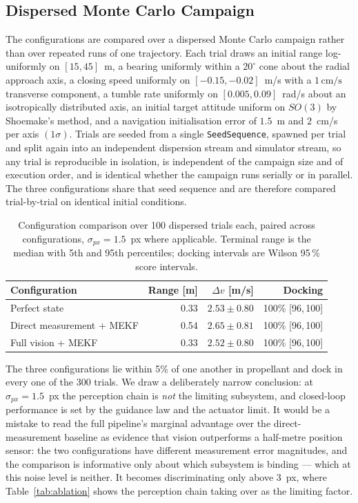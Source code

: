 \subsection{Dispersed Monte Carlo Campaign}
\label{sec:res_configs}

The configurations are compared over a dispersed Monte Carlo campaign rather
than over repeated runs of one trajectory. Each trial draws an initial range log-uniformly on $[15, 45]$~m, a bearing uniformly within a
$20^{\circ}$ cone about the radial approach axis, a closing speed uniformly on
$[-0.15, -0.02]$~m/s with a $1\,\mathrm{cm/s}$ transverse component, a tumble
rate uniformly on $[0.005, 0.09]$~rad/s about an isotropically distributed
axis, an initial target attitude uniform on $SO(3)$ by Shoemake's method, and
a navigation initialisation error of $1.5$~m and $2$~cm/s per axis
$(1\sigma)$. Trials are seeded from a single \texttt{SeedSequence}, spawned
per trial and split again into an independent dispersion stream and simulator
stream, so any trial is reproducible in isolation, is independent of the
campaign size and of execution order, and is identical whether the campaign
runs serially or in parallel. The three configurations share that seed
sequence and are therefore compared trial-by-trial on identical initial
conditions.

\begin{table}[!tb]
\caption{Configuration comparison over 100 dispersed trials each, paired
across configurations, $\sigma_{px} = 1.5$~px where applicable. Terminal range
is the median with 5th and 95th percentiles; docking intervals are Wilson
95\,\% score intervals.}
\label{tab:configs}
\centering
\begin{tabular}{lrrr}
\hline
Configuration & Range [m] & $\Delta v$ [m/s] & Docking \\
\hline
Perfect state             & 0.33 & $2.53 \pm 0.80$ & 100\% [96,\,100] \\
Direct measurement + MEKF & 0.54 & $2.65 \pm 0.81$ & 100\% [96,\,100] \\
Full vision + MEKF        & 0.33 & $2.52 \pm 0.80$ & 100\% [96,\,100] \\
\hline
\end{tabular}
\end{table}

The three configurations lie within 5\% of one another in propellant and dock
in every one of the 300 trials. We draw a deliberately narrow conclusion: at
$\sigma_{px} = 1.5$~px the perception chain is \emph{not} the limiting
subsystem, and closed-loop performance is set by the guidance law and the
actuator limit. It would be a mistake to read the full pipeline's marginal
advantage over the direct-measurement baseline as evidence that vision
outperforms a half-metre position sensor: the two configurations have
different measurement error magnitudes, and the comparison is informative only
about which subsystem is binding --- which at this noise level is neither. It
becomes discriminating only above 3~px, where Table~\ref{tab:ablation} shows
the perception chain taking over as the limiting factor.

